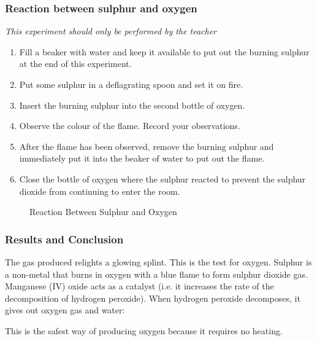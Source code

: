 \subsubsection*{Reaction between sulphur and oxygen}
\textit{This experiment should only be performed by the teacher}
\begin{enumerate}
\item{Fill a beaker with water and keep it available to put out the burning sulphur at the end of this experiment.}
\item{Put some sulphur in a deflagrating spoon and set it on fire.}
\item{Insert the burning sulphur into the second bottle of oxygen.}
\item{Observe the colour of the flame. Record your observations.}
\item{After the flame has been observed, remove the burning sulphur and immediately put it into the beaker of water to put out the flame.}
\item{Close the bottle of oxygen where the sulphur reacted to prevent the sulphur dioxide from continuing to enter the room.}
\end{enumerate}
\begin{figure}[h]
\begin{center}
\caption{Reaction Between Sulphur and Oxygen}
\label{fig:sulphur_and_oxygen}
\end{center}
\end{figure}

\subsubsection*{Results and Conclusion}
The gas produced relights a glowing splint. This is the test for oxygen. Sulphur is a non-metal that burns in oxygen with a blue flame to form sulphur dioxide gas. Manganese (IV) oxide acts as a catalyst (i.e. it increases the rate of the decomposition of hydrogen peroxide). When hydrogen peroxide decomposes, it gives out oxygen gas and water:
\begin{center}
\end{center}
This is the safest way of producing oxygen because it requires no heating.

